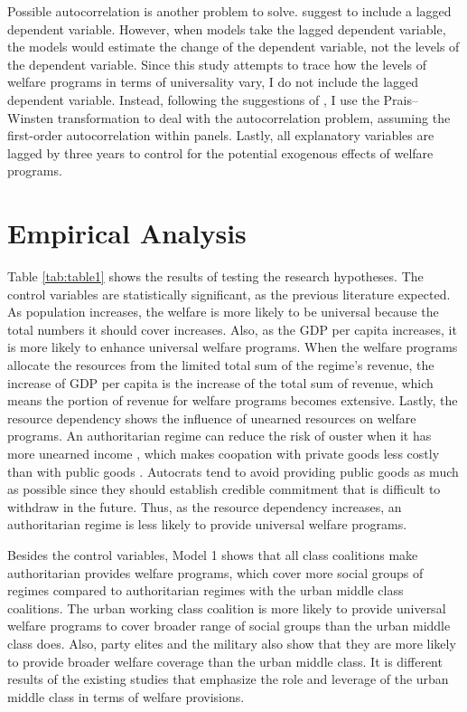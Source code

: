 \documentclass[12pt, letterpage, notitlepage]{article}
\begin{document}
Possible autocorrelation is another problem to solve. \citet{Beck1995} suggest to include a lagged dependent variable. However, when models take the lagged dependent variable, the models would estimate the change of the dependent variable, not the levels of the dependent variable. Since this study attempts to trace how the levels of welfare programs in terms of universality vary, I do not include the lagged dependent variable. Instead, following the suggestions of \citet{Plumper2005}, I use the Prais–Winsten transformation to deal with the autocorrelation problem, assuming the first-order autocorrelation within panels. Lastly, all explanatory variables are lagged by three years to control for the potential exogenous effects of welfare programs.

\section{Empirical Analysis}

Table \ref{tab:table1} shows the results of testing the research hypotheses. The control variables are statistically significant, as the previous literature expected. As population increases, the welfare is more likely to be universal because the total numbers it should cover increases. Also, as the GDP per capita increases, it is more likely to enhance universal welfare programs. When the welfare programs allocate the resources from the limited total sum of the regime's revenue, the increase of GDP per capita is the increase of the total sum of revenue, which means the portion of revenue for welfare programs becomes extensive. Lastly, the resource dependency shows the influence of unearned resources on welfare programs. An authoritarian regime can reduce the risk of ouster when it has more unearned income \citep{Wright2013}, which makes coopation with private goods less costly than with public goods \citep{BuenodeMesquita2003}. Autocrats tend to avoid providing public goods as much as possible since they should establish credible commitment that is difficult to withdraw in the future. Thus, as the resource dependency increases, an authoritarian regime is less likely to provide universal welfare programs.

Besides the control variables, Model 1 shows that all class coalitions make authoritarian provides welfare programs, which cover more social groups of regimes compared to authoritarian regimes with the urban middle class coalitions. The urban working class coalition is more likely to provide universal welfare programs to cover broader range of social groups than the urban middle class does. Also, party elites and the military also show that they are more likely to provide broader welfare coverage than the urban middle class. It is different results of the existing studies that emphasize the role and leverage of the urban middle class in terms of welfare provisions.
\end{document}
